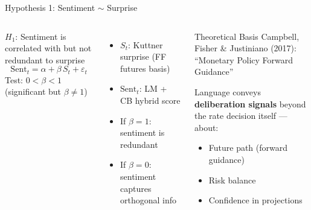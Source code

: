 \documentclass[aspectratio=169, 11pt]{beamer}
\begin{document}
\begin{frame}{Hypothesis 1: Sentiment $\sim$ Surprise}
  \begin{columns}[T]
    \begin{ablock}{$H_1$: Sentiment is correlated with but not redundant to surprise}
      \begin{equation}
        \mathrm{Sent}_t = \alpha + \beta\, S_t + \varepsilon_t
      \end{equation}
      Test: $0 < \beta < 1$ (significant but $\beta \neq 1$)
    \end{ablock}

    \begin{itemize}
      \item<2-> $S_t$: Kuttner surprise (FF futures basis)
      \item<3-> $\mathrm{Sent}_t$: LM + CB hybrid score
      \item<4-> If $\beta = 1$: sentiment is redundant
      \item<5-> If $\beta = 0$: sentiment captures orthogonal info
    \end{itemize}

    \begin{aalertblock}{Theoretical Basis}
      \footnotesize
      Campbell, Fisher \& Justiniano (2017): \\
      ``Monetary Policy Forward Guidance''

      \vspace{0.3em}
      Language conveys \textbf{deliberation signals} beyond the rate decision itself — about:
      \begin{itemize}
        \item Future path (forward guidance)
        \item Risk balance
        \item Confidence in projections
      \end{itemize}
    \end{aalertblock}
  \end{columns}
\end{frame}
\end{document}
